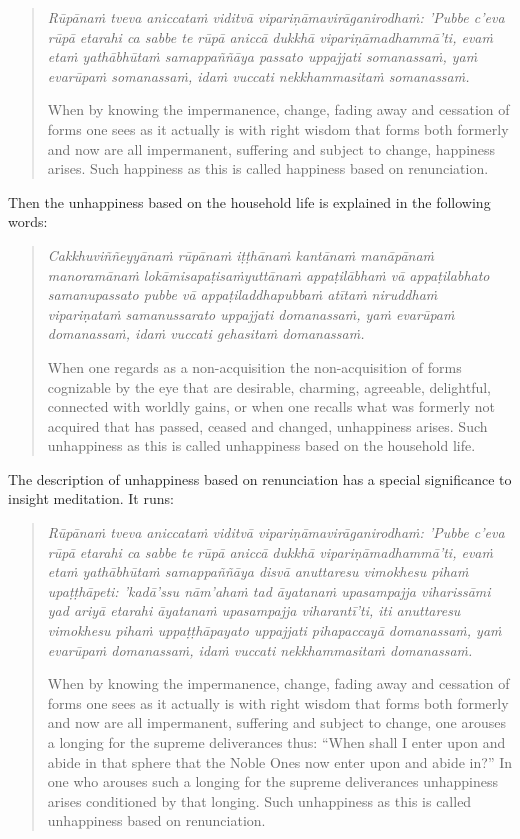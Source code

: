 \begin{quote}
\emph{Rūpānaṁ tveva aniccataṁ viditvā vipariṇāmavirāganirodhaṁ: 'Pubbe c'eva rūpā etarahi ca sabbe te rūpā aniccā dukkhā vipariṇāmadhammā'ti, evaṁ etaṁ yathābhūtaṁ samappaññāya passato uppajjati somanassaṁ, yaṁ evarūpaṁ somanassaṁ, idaṁ vuccati nekkhammasitaṁ somanassaṁ.}

When by knowing the impermanence, change, fading away and cessation of forms one sees as it actually is with right wisdom that forms both formerly and now are all impermanent, suffering and subject to change, happiness arises. Such happiness as this is called happiness based on renunciation.
\end{quote}

Then the unhappiness based on the household life is explained in the following words:

\begin{quote}
\emph{Cakkhuviññeyyānaṁ rūpānaṁ iṭṭhānaṁ kantānaṁ manāpānaṁ manoramānaṁ lokāmisapaṭisaṁyuttānaṁ appaṭilābhaṁ vā appaṭilabhato samanupassato pubbe vā appaṭiladdhapubbaṁ atītaṁ niruddhaṁ vipariṇataṁ samanussarato uppajjati domanassaṁ, yaṁ evarūpaṁ domanassaṁ, idaṁ vuccati gehasitaṁ domanassaṁ.}

When one regards as a non-acquisition the non-acquisition of forms cognizable by the eye that are desirable, charming, agreeable, delightful, connected with worldly gains, or when one recalls what was formerly not acquired that has passed, ceased and changed, unhappiness arises. Such unhappiness as this is called unhappiness based on the household life.
\end{quote}

The description of unhappiness based on renunciation has a special significance to insight meditation. It runs:

\begin{quote}
\emph{Rūpānaṁ tveva aniccataṁ viditvā vipariṇāmavirāganirodhaṁ: 'Pubbe c'eva rūpā etarahi ca sabbe te rūpā aniccā dukkhā vipariṇāmadhammā'ti, evaṁ etaṁ yathābhūtaṁ samappaññāya disvā anuttaresu vimokhesu pihaṁ upaṭṭhāpeti: 'kadā'ssu nām'ahaṁ tad āyatanaṁ upasampajja viharissāmi yad ariyā etarahi āyatanaṁ upasampajja viharantī'ti, iti anuttaresu vimokhesu pihaṁ uppaṭṭhāpayato uppajjati pihapaccayā domanassaṁ, yaṁ evarūpaṁ domanassaṁ, idaṁ vuccati nekkhammasitaṁ domanassaṁ.}

When by knowing the impermanence, change, fading away and cessation of forms one sees as it actually is with right wisdom that forms both formerly and now are all impermanent, suffering and subject to change, one arouses a longing for the supreme deliverances thus: ``When shall I enter upon and abide in that sphere that the Noble Ones now enter upon and abide in?'' In one who arouses such a longing for the supreme deliverances unhappiness arises conditioned by that longing. Such unhappiness as this is called unhappiness based on renunciation.
\end{quote}

